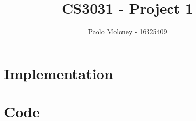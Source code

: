 \documentclass{article}
\title{CS3031 - Project 1}
\author{Paolo Moloney - 16325409}
\begin{document}
\maketitle
\newpage

\tableofcontents
\newpage

\section{Implementation}

\section{Code}
\end{document}
